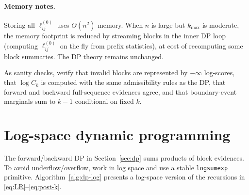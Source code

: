 \paragraph{Memory notes.}
Storing all $\ell^{(0)}_{ij}$ uses $\Theta(n^2)$ memory.
When $n$ is large but $k_{\max}$ is moderate, the memory footprint is reduced by streaming
blocks in the inner DP loop (computing $\ell^{(0)}_{ij}$ on the fly from prefix statistics), at
cost of recomputing some block summaries.
The DP theory remains unchanged.

As sanity checks, verify that invalid blocks are represented by $-\infty$ log-scores, that $\log C_k$ is computed with the same admissibility rules as the DP, that forward and backward full-sequence evidences agree, and that boundary-event marginals sum to $k-1$ conditional on fixed $k$.

\section{Log-space dynamic programming}
\label{sec:alg-dp-impl}

The forward/backward DP in Section~\ref{sec:dp} sums products of block evidences.
To avoid underflow/overflow, work in log space and use a stable
\texttt{logsumexp} primitive.
Algorithm~\ref{alg:dp-log} presents a log-space version of the recursions in
\eqref{eq:LR}--\eqref{eq:post-k}.

